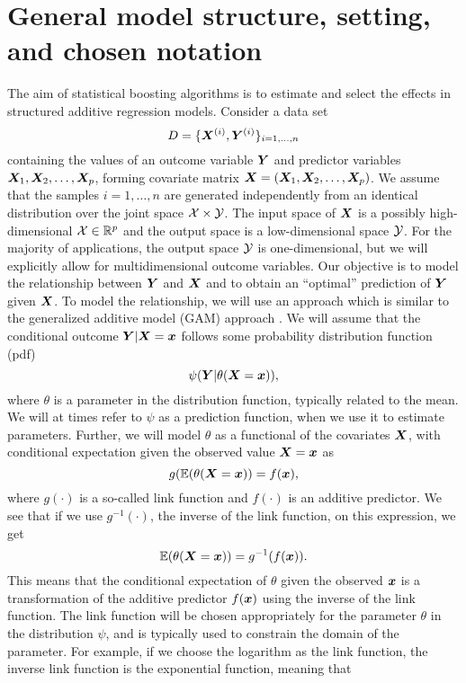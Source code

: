\section{General model structure, setting, and chosen notation} %
The aim of statistical boosting algorithms is to estimate and select the effects in structured additive regression models. Consider a data set
\begin{equation}
    D=\{\bm{X}^{(i)},\bm{Y}^{(i)}\}_{i=1,\ldots,n}
\end{equation}
containing the values of an outcome variable $\bm{Y}$ and predictor variables $\bm{X}_1, \bm{X}_2,\ldots,\bm{X}_p$, forming covariate matrix $\bm{X}=(\bm{X}_1, \bm{X}_2,\ldots,\bm{X}_p)$. We assume that the samples $i=1,\ldots,n$ are generated independently from an identical distribution over the joint space $\mathcal{X}\times\mathcal{Y}$. The input space of $\bm{X}$ is a possibly high-dimensional $\mathcal{X}\in\mathbb{R}^p$ and the output space is a low-dimensional space $\mathcal{Y}$. For the majority of applications, the output space $\mathcal{Y}$ is one-dimensional, but we will explicitly allow for multidimensional outcome variables. Our objective is to model the relationship between $\bm{Y}$ and $\bm{X}$ and to obtain an ``optimal'' prediction of $\bm{Y}$ given $\bm{X}$. To model the relationship, we will use an approach which is similar to the generalized additive model (GAM) approach \citep{gam-book}. We will assume that the conditional outcome $\bm{Y}|\bm{X}=\bm{x}$ follows some probability distribution function (pdf)
\begin{equation}\label{eq:psi}
    \psi(\bm{Y}|\theta(\bm{X}=\bm{x})),
\end{equation}
where $\theta$ is a parameter in the distribution function, typically related to the mean. We will at times refer to $\psi$ as a prediction function, when we use it to estimate parameters.
Further, we will model $\theta$ as a functional of the covariates $\bm{X}$, with conditional expectation given the observed value $\bm{X}=\bm{x}$ as
\begin{equation}
    g(\mathbb{E}(\theta(\bm{X}=\bm{x}))=f(\bm{x}),
\end{equation}
where $g(\cdot)$ is a so-called link function and $f(\cdot)$ is an additive predictor. We see that if we use $g^{-1}(\cdot)$, the inverse of the link function, on this expression, we get
\begin{equation}
    \mathbb{E}(\theta(\bm{X}=\bm{x}))=g^{-1}(f(\bm{x})).
\end{equation}
This means that the conditional expectation of $\theta$ given the observed $\bm{x}$ is a transformation of the additive predictor $f(\bm{x})$ using the inverse of the link function. The link function will be chosen appropriately for the parameter $\theta$ in the distribution $\psi$, and is typically used to constrain the domain of the parameter. For example, if we choose the logarithm as the link function, the inverse link function is the exponential function, meaning that
